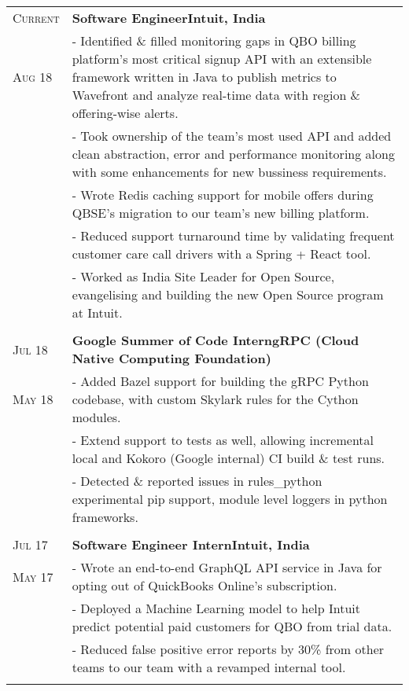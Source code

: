 \documentclass[a4paper,10pt]{extarticle} %
\begin{document}
\begin{tabularx}{\linewidth}{ l | X }

\textsc{Current} & \textbf{Software Engineer}\hfill\textbf{Intuit, India}\\
\textsc{Aug 18}& {- Identified \& filled monitoring gaps in QBO billing platform's most critical signup API with an extensible framework written in Java to publish metrics to Wavefront and analyze real-time data with region \& offering-wise alerts.}\\
& {- Took ownership of the team's most used API and added clean abstraction, error and performance monitoring along with some enhancements for new bussiness requirements.}\\
& {- Wrote Redis caching support for mobile offers during QBSE's migration to our team's new billing platform.}\\
& {- Reduced support turnaround time by validating frequent customer care call drivers with a Spring + React tool.}\\
& {- Worked as India Site Leader for Open Source, evangelising and building the new Open Source program at Intuit.}\\
\multicolumn{2}{c}{} \\

\textsc{Jul 18} & \textbf{Google Summer of Code Intern}\hfill\textbf{gRPC (Cloud Native Computing Foundation)}\\
\textsc{May 18}& {- Added Bazel support for building the gRPC Python codebase, with custom Skylark rules for the Cython modules.}\\
& {- Extend support to tests as well, allowing incremental local and Kokoro (Google internal) CI build \& test runs.}\\
& {- Detected \& reported issues in rules\_python experimental pip support, module level loggers in python frameworks.}\\
\multicolumn{2}{c}{} \\

\textsc{Jul 17} & \textbf{Software Engineer Intern}\hfill\textbf{Intuit, India}\\
\textsc{May 17}& {- Wrote an end-to-end GraphQL API service in Java for opting out of QuickBooks Online's subscription.}\\
& {- Deployed a Machine Learning model to help Intuit predict potential paid customers for QBO from trial data.}\\
& {- Reduced false positive error reports by 30\% from other teams to our team with a revamped internal tool.}\\
\multicolumn{2}{c}{} \\


\end{tabularx}
\end{document}
